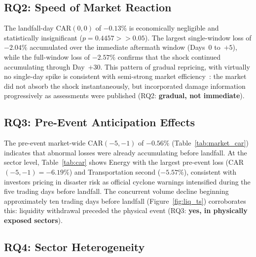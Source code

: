 \documentclass[sigconf, nonacm]{acmart}
\begin{document}
\subsection{RQ2: Speed of Market Reaction}

The landfall-day CAR$(0,0)$ of $-0.13\%$ is economically negligible and
statistically insignificant ($p = 0.4457 >> 0.05$). The largest single-window loss of $-2.04\%$
accumulated over the immediate aftermath window (Days~0 to~$+5$), while
the full-window loss of $-2.57\%$ confirms that the shock continued
accumulating through Day~$+30$. This pattern of gradual repricing, with
virtually no single-day spike is consistent with semi-strong market
efficiency~\cite{mackinlay1997}: the market did not absorb the shock
instantaneously, but incorporated damage information progressively as
assessments were published (RQ2: \textbf{gradual, not immediate}).

\subsection{RQ3: Pre-Event Anticipation Effects}

The pre-event market-wide CAR$(-5,-1)$ of $-0.56\%$ (Table~\ref{tab:market_car})
indicates that abnormal losses were already accumulating before landfall.
At the sector level, Table~\ref{tab:car} shows Energy with the
largest pre-event loss (CAR$(-5,-1) = -6.19\%$) and Transportation
 second ($-5.57\%$), consistent with investors pricing in disaster
risk as official cyclone warnings intensified during the five trading days
before landfall. The concurrent volume decline beginning approximately ten
trading days before landfall (Figure~\ref{fig:liq_ts}) corroborates this:
liquidity withdrawal preceded the physical event (RQ3: \textbf{yes, in
physically exposed sectors}).

\subsection{RQ4: Sector Heterogeneity}
\end{document}
